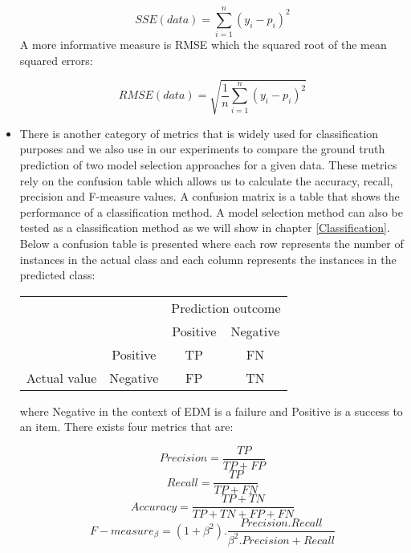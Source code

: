 \begin{itemize}
\begin{equation}
SSE(data) = \sum_{i=1}^{n} (y_i - p_i)^2
\label{SSE}
\end{equation}
A more informative measure is RMSE which the squared root of the mean squared errors:

\begin{equation}
 RMSE(data) = \sqrt{\frac{1}{n}\sum_{i = 1}^{n}(y_i - p_i)^2}
\end{equation}

\item There is another category of metrics that is widely used for classification purposes and we also use in our experiments to compare the ground truth prediction of two model selection approaches for a given data. These metrics rely on the confusion table which allows us to calculate the accuracy, recall, precision and F-measure values. A confusion matrix is a table that shows the performance of a classification method. A model selection method can also be tested as a classification method as we will show in chapter \ref{Classification}. Below a confusion table is presented where each row represents the number of instances in the actual class and each column represents the instances in the predicted class:


\begin{center}
\begin{tabular}{c|c|c|c|}
\multicolumn{2}{c}{}&\multicolumn{2}{c}{Prediction outcome}\tabularnewline
\cline{3-4}
\multicolumn{2}{c|}{}& \multicolumn{1}{c|}{Positive} & \multicolumn{1}{c|}{Negative} \tabularnewline
\cline{2-4}
&  \multicolumn{1}{c|}{Positive }&TP&FN\tabularnewline
\cline{2-4}
\multirow{-2}{*}{Actual value}& \multicolumn{1}{c|}{Negative} &FP&TN\tabularnewline
\cline{2-4}
\end{tabular}

\end{center}


\quad

where Negative in the context of EDM is a failure and Positive is a success to an item. There exists four metrics that are:

\begin{center}
\[Precision = \frac{TP}{TP+FP}\]
\[Recall = \frac{TP}{TP+FN}\]
\[Accuracy = \frac{TP+TN}{TP+TN+FP+FN}\]
\[F-measure_\beta = (1+\beta^2).\frac{Precision.Recall}{\beta^2.Precision+Recall}\]
\end{center}

\quad


\end{itemize}


